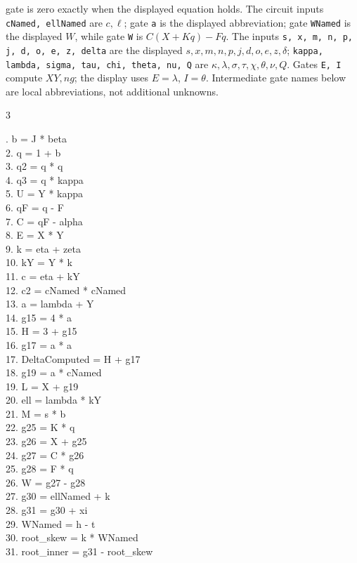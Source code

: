 \documentclass[10pt]{article}
\begin{document}
gate is zero exactly when the displayed equation holds. The circuit inputs
\texttt{cNamed, ellNamed} are $c,\ell$; gate \texttt{a} is the displayed abbreviation; gate \texttt{WNamed} is the
displayed $W$, while gate \texttt{W} is $C(X+Kq)-Fq$. The inputs
\texttt{s, x, m, n, p, j, d, o, e, z, delta} are the displayed
$s,x,m,n,p,j,d,o,e,z,\delta$; \texttt{kappa, lambda, sigma, tau, chi, theta, nu, Q}
are $\kappa,\lambda,\sigma,\tau,\chi,\theta,\nu,Q$. Gates \texttt{E, I} compute
$XY,ng$; the display uses $E=\lambda$, $I=\theta$. Intermediate gate
names below are local abbreviations, not additional unknowns.
\begin{multicols}{3}
\raggedright\ttfamily\fontsize{7.2}{8.4}. b = J * beta\\
2. q = 1 + b\\
3. q2 = q * q\\
4. q3 = q * kappa\\
5. U = Y * kappa\\
6. qF = q - F\\
7. C = qF - alpha\\
8. E = X * Y\\
9. k = eta + zeta\\
10. kY = Y * k\\
11. c = eta + kY\\
12. c2 = cNamed * cNamed\\
13. a = lambda + Y\\
14. g15 = 4 * a\\
15. H = 3 + g15\\
16. g17 = a * a\\
17. DeltaComputed = H + g17\\
18. g19 = a * cNamed\\
19. L = X + g19\\
20. ell = lambda * kY\\
21. M = s * b\\
22. g25 = K * q\\
23. g26 = X + g25\\
24. g27 = C * g26\\
25. g28 = F * q\\
26. W = g27 - g28\\
27. g30 = ellNamed + k\\
28. g31 = g30 + xi\\
29. WNamed = h - t\\
30. root\_skew = k * WNamed\\
31. root\_inner = g31 - root\_skew\\

\end{multicols}
\end{document}
